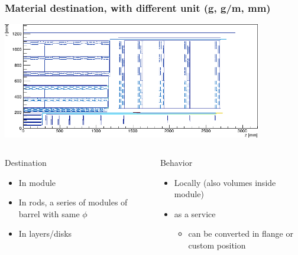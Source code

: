 \documentclass[pdftex, 11pt]{beamer}
\begin{document}
\begin{frame}
  \frametitle{Material destination, with different \alert{unit} (g, g/m, mm)}
  \begin{center}
    \includegraphics[width=0.85\textwidth]{img/materialScheme.png}
  \end{center}
  \vspace*{-0.8cm}
  \begin{columns}[t]
    \begin{column}{0.47\textwidth}
      \begin{block}{Destination}
        \begin{itemize}
        \item In \alert{module}
          \pause
        \item In \alert{rods}, a series of modules of barrel with same $\phi$
          \pause
        \item In \alert{layers/disks}
        \end{itemize}
      \end{block}
    \end{column}
    \pause
    \begin{column}{0.47\textwidth}
      \begin{block}{Behavior}
        \begin{itemize}
        \item \alert{Locally} (also volumes inside module)
          \pause
        \item as a \alert{service}
          \pause
          \begin{itemize}
          \item can be \alert{converted} in flange or custom position
          \end{itemize}
        \end{itemize}
      \end{block}
    \end{column}
  \end{columns}
\end{frame}
\end{document}
